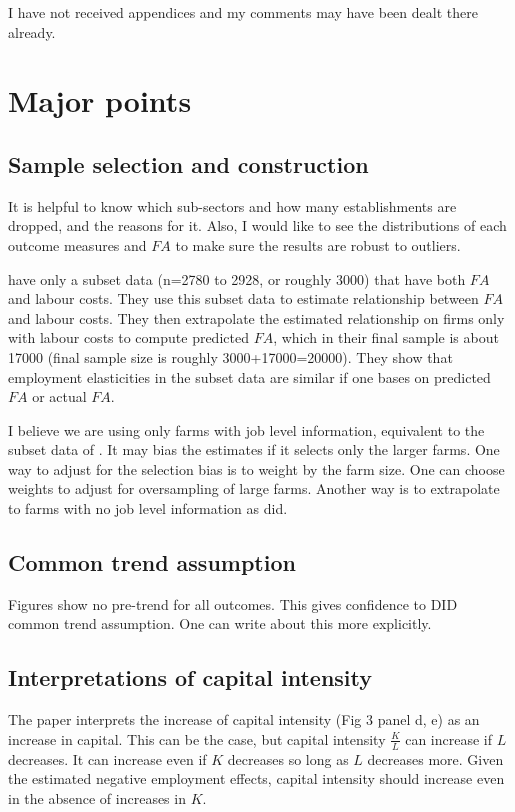 I have not received appendices and my comments may have been dealt there already.


\section{Major points}

\subsection{Sample selection and construction}

It is helpful to know which sub-sectors and how many establishments are dropped, and the reasons for it. Also, I would like to see the distributions of each outcome measures and $FA$ to make sure the results are robust to outliers.

\citet[][Table A12]{HarasztosiLindner2019} have only a subset data (n=2780 to 2928, or roughly 3000) that have both $FA$ and labour costs. They use this subset data to estimate relationship between $FA$ and labour costs. They then extrapolate the estimated relationship on firms only with labour costs to compute predicted $FA$, which in their final sample is about 17000 (final sample size is roughly 3000+17000=20000). They show that employment elasticities in the subset data are similar if one bases on predicted $FA$ or actual $FA$.

I believe we are using only farms with job level information, equivalent to the subset data of \citet{HarasztosiLindner2019}. It may bias the estimates if it selects only the larger farms. One way to adjust for the selection bias is to weight by the farm size. One can choose weights to adjust for oversampling of large farms. Another way is to extrapolate to farms with no job level information as \citet{HarasztosiLindner2019} did.


\subsection{Common trend assumption}

Figures show no pre-trend for all outcomes. This gives confidence to DID common trend assumption. One can write about this more explicitly.

\subsection{Interpretations of capital intensity}

The paper interprets the increase of capital intensity (Fig 3 panel d, e) as an increase in capital. This can be the case, but capital intensity $\frac{K}{L}$ can increase if $L$ decreases. It can increase even if $K$ decreases so long as $L$ decreases more. Given the estimated negative employment effects, capital intensity should increase even in the absence of increases in $K$.

